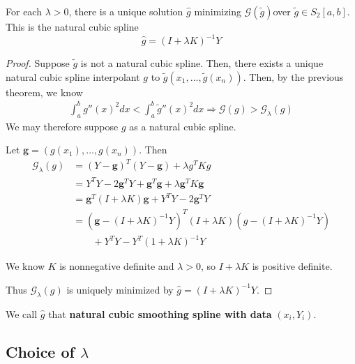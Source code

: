 \begin{thm}
  \label{defn:nonparametric_regression:4}
  For each $\lambda > 0$, there is a unique solution $\hat g$ minimizing
  $\mathcal{G}(\tilde g)$over $\tilde g \in S_{2}[a, b]$.  This is the
  natural cubic spline
  \begin{equation}
    \label{eq:71}
    \hat g = (I + \lambda K)^{-1} Y
  \end{equation}
\end{thm}

\begin{proof}
  Suppose $\tilde g$ is not a natural cubic spline.  Then, there
  exists a unique natural cubic spline interpolant $g$ to $\tilde
  g(x_{1}, \dots, \tilde g(x_{n}))$.  Then, by the previous theorem,
  we know
  \begin{align}
    \label{eq:72}
    \int_{a}^{b} g''(x)^{2} dx < \int_{a}^{b} \tilde g''(x)^{2} dx
    \Rightarrow \mathcal{G} (g) > \mathcal{G}_{\lambda}(g)
  \end{align}
  We may therefore suppose $g$ as a natural cubic spline.

  Let $\mathbf{g} = (g(x_{1}), \dots, g(x_{n}))$.  Then
  \begin{align}
    \label{eq:73}
    \mathcal{G}_{\lambda}(g) &= (Y - \mathbf{g})^{T}(Y - \mathbf{g}) +
    \lambda g^{T} K g \\
    &= Y^{T} Y - 2 \mathbf{g}^{T} Y + \mathbf{g}^{T} \mathbf{g} +
    \lambda \mathbf{g}^{T} K \mathbf{g} \\
    &= \mathbf{g}^{T}(I + \lambda K) \mathbf{g} + Y^{T} Y - 2
    \mathbf{g}^{T} Y \\
    &= (\mathbf{g} - (I + \lambda K)^{-1} Y)^{T} (I + \lambda K)(g -
    (I + \lambda K)^{-1} Y) \\
    \label{eq:151}
    &\qquad + Y^{T} Y - Y^{T}(1 + \lambda K)^{-1} Y
  \end{align}

  We know $K$ is nonnegative definite and $\lambda > 0$, so $I +
  \lambda K$ is positive definite.

  Thus $\mathcal{G}_{\lambda}(g)$ is uniquely minimized by $\hat g =
  (I + \lambda K)^{-1} Y$.

\end{proof}

We call $\hat g$ that \textbf{natural cubic smoothing spline with
  data} $(x_{i}, Y_{i})$.

\subsection{Choice of $\lambda$}
\label{sec:choice-lambda}

